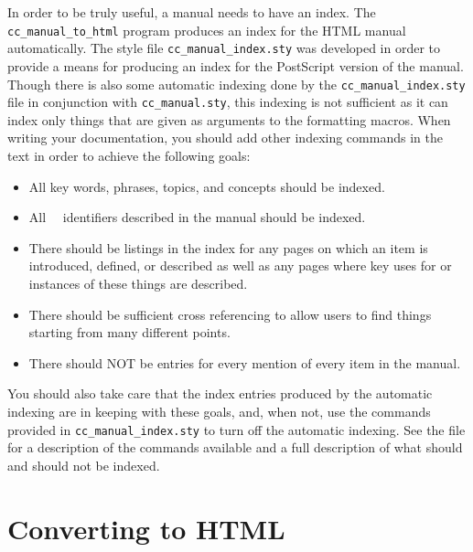 In order to be truly useful, a manual needs to have an index.  The 
{\tt cc\_manual\_to\_html} program produces an index for the HTML manual
automatically.  %
The style file {\tt cc\_manual\_index.sty}%
 was developed in order to provide
a means for producing an index for the PostScript version of the manual.  
Though there is also some automatic indexing done by the
{\tt cc\_manual\_index.sty} file in conjunction with {\tt cc\_manual.sty},
this indexing is not sufficient as it can index only things that are
given as arguments to the formatting macros.  When writing your
documentation, you should add other indexing commands in the text in
order to achieve the following goals:
\begin{itemize}
   \item All key words, phrases, topics, and concepts should be indexed.
   \item All \cgal\ \CC\ identifiers described in the manual should be indexed.
   \item There should be listings in the index for any pages on which an
         item is introduced, defined, or described as well as any pages
         where key uses for or instances of these things are described.
   \item There should be sufficient cross referencing to allow users
         to find things starting from many different points.
   \item There should NOT be entries for every mention of every item in the
         manual.
\end{itemize}

You should also take care that the index entries produced by the automatic
indexing are in keeping with these goals, and, when not, use the commands
provided in {\tt cc\_manual\_index.sty} to turn off the automatic indexing.
See the file 
for a description of the commands available and a full description of what
should and should not be indexed.

\section{Converting to HTML}
\label{sec:html_conversion}

